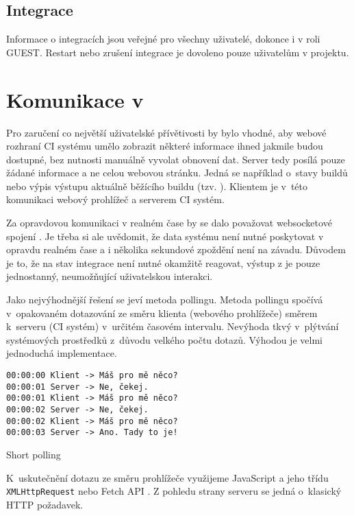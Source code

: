 \subsection{Integrace}

Informace o integracích jsou veřejné pro všechny uživatelé, dokonce i v roli GUEST.
Restart nebo zrušení integrace je dovoleno pouze uživatelům v projektu.

\section{Komunikace v }

Pro zaručení co největší uživatelské přívětivosti by bylo vhodné, aby webové rozhraní CI systému umělo zobrazit některé informace ihned jakmile budou dostupné, bez nutnosti manuálně vyvolat obnovení dat.
Server tedy posílá pouze žádané informace a ne celou webovou stránku.
Jedná se například o~stavy buildů nebo výpis výstupu aktuálně běžícího buildu (tzv. ).
Klientem je v~této komunikaci webový prohlížeč a serverem CI systém.

Za opravdovou komunikaci v realném čase by se dalo považovat websocketové spojení \cite{websocket}.
Je třeba si ale uvědomit, že data systému není nutné poskytovat v opravdu realném čase a i několika sekundové zpoždění není na závadu.
Důvodem je to, že na stav integrace není nutné okamžitě reagovat, výstup z  je pouze jednostanný, neumožňující uživatelskou interakci.

Jako nejvýhodnější řešení se jeví metoda pollingu.
Metoda pollingu spočívá v~opakovaném dotazování ze směru klienta (webového prohlížeče) směrem k~serveru (CI systém) v~určitém časovém intervalu.
Nevýhoda tkvý v~plýtvání systémových prostředků z~důvodu velkého počtu dotazů.
Výhodou je velmi jednoduchá implementace.

\begin{listing}[ht]
\begin{verbatim}
00:00:00 Klient -> Máš pro mě něco?
00:00:01 Server -> Ne, čekej.
00:00:01 Klient -> Máš pro mě něco?
00:00:02 Server -> Ne, čekej.
00:00:02 Klient -> Máš pro mě něco?
00:00:03 Server -> Ano. Tady to je!
\end{verbatim}
\caption{Short polling}
\end{listing}

K~uskutečnění dotazu ze směru prohlížeče využijeme JavaScript a jeho třídu \verb|XMLHttpRequest| nebo Fetch API \cite{fetch_api}.
Z pohledu strany serveru se jedná o~klasický HTTP požadavek.

